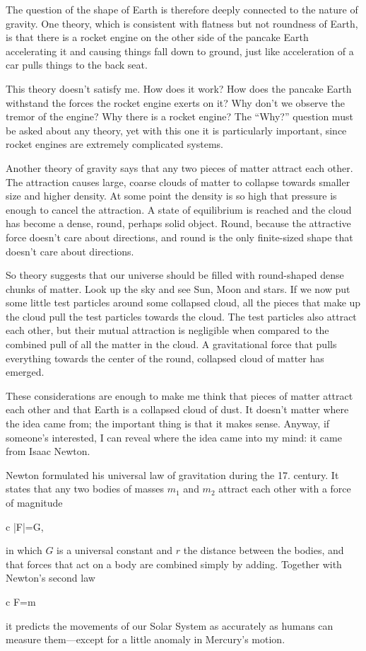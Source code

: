 \documentclass[11pt,oneside%
]{memoir}
\newenvironment{eqna}{\begin{IEEEeqnarray*}{c}}{\end{IEEEeqnarray*}\ignorespacesafterend}
\newcommand{\der}[2]{\frac{\dd#1}{\dd#2}}
\newcommand{\dd}{\mathrm{d}}
\begin{document}
The question of the shape of Earth is therefore deeply connected to the nature of gravity. One theory, which is consistent with flatness but not roundness of Earth, is that there is a rocket engine on the other side of the pancake Earth accelerating it and causing things fall down to ground, just like acceleration of a car pulls things to the back seat.

This theory doesn't satisfy me. How does it work? How does the pancake Earth withstand the forces the rocket engine exerts on it? Why don't we observe the tremor of the engine? Why there is a rocket engine? The ``Why?'' question must be asked about any theory, yet with this one it is particularly important, since rocket engines are extremely complicated systems.

Another theory of gravity says that any two pieces of matter attract each other. The attraction causes large, coarse clouds of matter to collapse towards smaller size and higher density. At some point the density is so high that pressure is enough to cancel the attraction. A state of equilibrium is reached and the cloud has become a dense, round, perhaps solid object. Round, because the attractive force doesn't care about directions, and round is the only finite-sized shape that doesn't care about directions.

So theory suggests that our universe should be filled with round-shaped dense chunks of matter. Look up the sky and see Sun, Moon and stars. If we now put some little test particles around some collapsed cloud, all the pieces that make up the cloud pull the test particles towards the cloud. The test particles also attract each other, but their mutual attraction is negligible when compared to the combined pull of all the matter in the cloud. A gravitational force that pulls everything towards the center of the round, collapsed cloud of matter has emerged.

These considerations are enough to make me think that pieces of matter attract each other and that Earth is a collapsed cloud of dust. It doesn't matter where the idea came from; the important thing is that it makes sense. Anyway, if someone's interested, I can reveal where the idea came into my mind: it came from Isaac Newton.

Newton formulated his universal law of gravitation during the 17. century. It states that any two bodies of masses \(m_1\) and \(m_2\) attract each other with a force of magnitude
\begin{eqna}
|F|=G,
\end{eqna}
in which \(G\) is a universal constant and \(r\) the distance between the bodies, and that forces that act on a body are combined simply by adding. Together with Newton's second law
\begin{eqna}
F=m\der{^2x}{t^2}
\end{eqna}
it predicts the movements of our Solar System as accurately as humans can measure them---except for a little anomaly in Mercury's motion.
\end{document}
